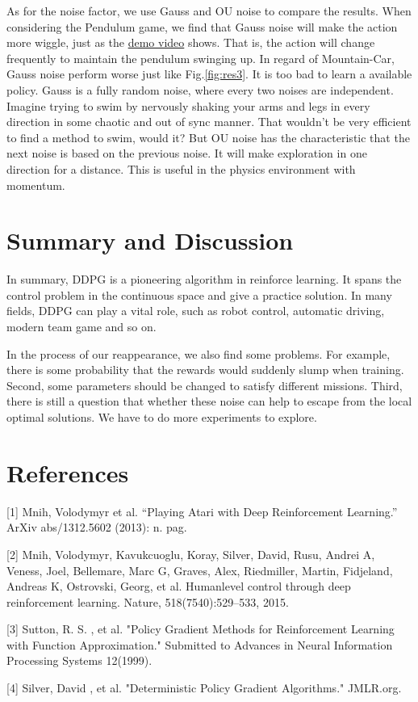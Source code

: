 \documentclass[a4paper,12pt,oneside,article]{memoir}
\begin{document}
As for the noise factor, we use Gauss and OU noise to compare the results. When considering the Pendulum game, we find that Gauss noise will make the action more wiggle, just as the \href{https://github.com/zeng798473532/DDPG-RL-final/tree/main/wrapper/Testing-Pendulum-v1-Gauss-Gamma0.95-Tau0.01-2022-1-19}{demo video} shows. That is, the action will change frequently to maintain the pendulum swinging up. In regard of Mountain-Car, Gauss noise perform worse just like Fig.\ref{fig:res3}. It is too bad to learn a available policy. Gauss is a fully random noise, where every two noises are independent. Imagine trying to swim by nervously shaking your arms and legs in every direction in some chaotic and out of sync manner. That wouldn’t be very efficient to find a method to swim, would it? But OU noise has the characteristic that the next noise is based on the previous noise. It will make exploration in one direction for a distance. This is useful in the physics environment with momentum.



\chapter{Summary and Discussion}
In summary, DDPG is a pioneering algorithm in reinforce learning. It spans the control problem in the continuous space and give a practice solution. In many fields, DDPG can play a vital role, such as robot control, automatic driving, modern team game and so on.


In the process of our reappearance, we also find some problems. For example, there is some probability that the rewards would suddenly slump when training. Second, some parameters should be changed to satisfy different missions. Third, there is still a question that whether these noise can help to escape from the local optimal solutions. We have to do more experiments to explore.


\chapter*{References}

[1] Mnih, Volodymyr et al. “Playing Atari with Deep Reinforcement Learning.” ArXiv abs/1312.5602 (2013): n. pag.

[2] Mnih, Volodymyr, Kavukcuoglu, Koray, Silver, David, Rusu, Andrei A, Veness, Joel, Bellemare, Marc G, Graves, Alex, Riedmiller, Martin, Fidjeland, Andreas K, Ostrovski, Georg, et al. Humanlevel control through deep reinforcement learning. Nature, 518(7540):529–533, 2015.

[3] Sutton, R. S. , et al. "Policy Gradient Methods for Reinforcement Learning with Function Approximation." Submitted to Advances in Neural Information Processing Systems 12(1999).

[4] Silver, David , et al. "Deterministic Policy Gradient Algorithms." JMLR.org.



\end{document}
